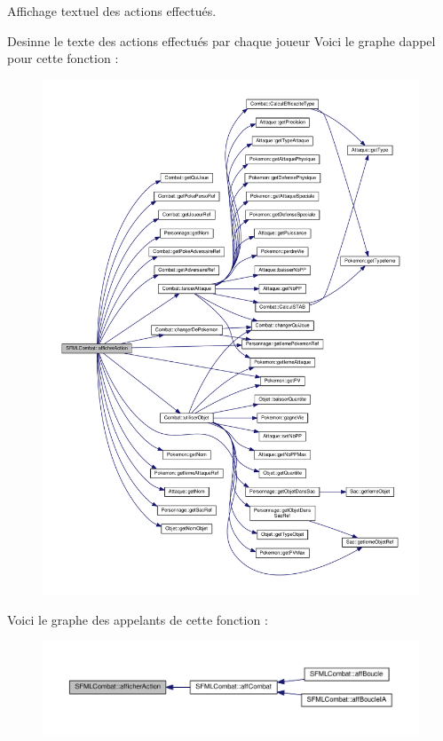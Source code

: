 Affichage textuel des actions effectués. 

Desinne le texte des actions effectués par chaque joueur Voici le graphe d\textquotesingle{}appel pour cette fonction \+:\nopagebreak
\begin{figure}[H]
\begin{center}
\leavevmode
\includegraphics[width=350pt]{class_s_f_m_l_combat_acc968da97d4c933f516e67b0356e3d73_cgraph}
\end{center}
\end{figure}
Voici le graphe des appelants de cette fonction \+:\nopagebreak
\begin{figure}[H]
\begin{center}
\leavevmode
\includegraphics[width=350pt]{class_s_f_m_l_combat_acc968da97d4c933f516e67b0356e3d73_icgraph}
\end{center}
\end{figure}
\mbox{\label{class_s_f_m_l_combat_a55c6728be410efdf2ca919a9ee44728a}} 
